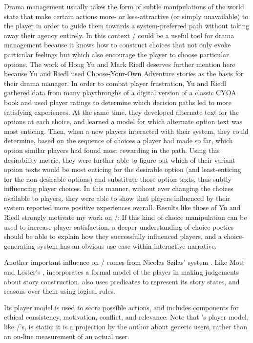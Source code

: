 Drama management usually takes the form of subtle manipulations of the world state that make certain actions more- or less-attractive (or simply unavailable) to the player in order to guide them towards a system-preferred path without taking away their agency entirely.
%
In this context \dunyazad/ could be a useful tool for drama management because it knows how to construct choices that not only evoke particular feelings but which also encourage the player to choose particular options.
%
The work of Hong Yu and Mark Riedl \citep{Yu2013} deserves further mention here because Yu and Riedl used Choose-Your-Own Adventure stories as the basis for their drama manager.
%
In order to combat player frustration, Yu and Riedl gathered data from many playthroughs of a digital version of a classic CYOA book and used player ratings to determine which decision paths led to more satisfying experiences.
%
At the same time, they developed alternate text for the options at each choice, and learned a model for which alternate option text was most enticing.
%
Then, when a new players interacted with their system, they could determine, based on the sequence of choices a player had made so far, which option similar players had found most rewarding in the path.
%
Using this desirability metric, they were further able to figure out which of their variant option texts would be most enticing for the desirable option (and least-enticing for the non-desirable options) and substitute those option texts, thus subtly influencing player choices.
%
In this manner, without ever changing the choices available to players, they were able to show that players influenced by their system reported more positive experiences overall.
%
Results like those of Yu and Riedl strongly motivate my work on \dunyazad/: If this kind of choice manipulation can be used to increase player satisfaction, a deeper understanding of choice poetics should be able to explain how they successfully influenced players, and a choice-generating system has an obvious use-case within interactive narrative.


Another important influence on \dunyazad/ comes from Nicolas Szilas'  system \citep{Szilas2003,Szilas2007}.
%
Like Mott and Lester's ,  incorporates a formal model of the player in making judgements about story construction.
%
 also uses predicates to represent its story states, and reasons over them using logical rules.

Its player model is used to score possible actions, and includes components for ethical consistency, motivation, conflict, and relevance.
%
Note that 's player model, like \dunyazad/'s, is static: it is a projection by the author about generic users, rather than an on-line measurement of an actual user.


